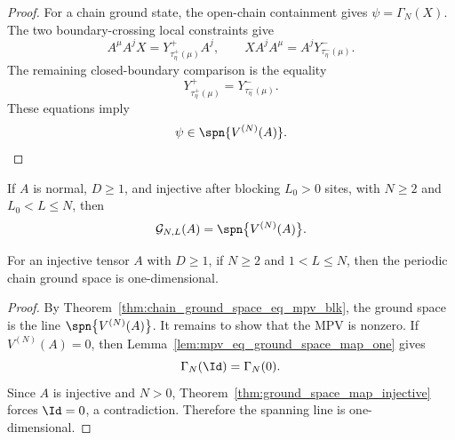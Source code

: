 \begin{proof}
    \notready
    For a chain ground state, the open-chain containment gives
    $\psi=\Gamma_N(X)$. The two boundary-crossing local constraints give
    \[
        A^\mu A^j X = Y^+_{\tau^+_\eta(\mu)}A^j,
        \qquad
        X A^j A^\mu = A^jY^-_{\tau^-_\eta(\mu)}.
    \]
    The remaining closed-boundary comparison is the equality
    \[
        Y^+_{\tau^+_\eta(\mu)} = Y^-_{\tau^-_\eta(\mu)}.
    \]
    These equations imply
    \[
        \psi\in\spn\{V^{(N)}(A)\}.
    \]
\end{proof}

\begin{theorem}%
    \label{thm:chain_ground_space_eq_mpv_normal}
    \leanok
    If $A$ is normal, $D \ge 1$, and injective after blocking $L_0>0$ sites, with
    $N \ge 2$ and $L_0 < L \le N$, then
    \[
        \mathcal G_{N,L}(A) = \spn\bigl\{V^{(N)}(A)\bigr\}.
    \]
\end{theorem}

\begin{theorem}%
    \label{thm:ground_space_unique_periodic}
    \leanok
    For an injective tensor $A$ with $D \ge 1$, if $N \ge 2$ and
    $1 < L \le N$, then the periodic chain ground space is one-dimensional.
\end{theorem}

\begin{proof}
    \leanok
    By Theorem~\ref{thm:chain_ground_space_eq_mpv_blk}, the ground space is the line
    $\spn\bigl\{V^{(N)}(A)\bigr\}$. It remains to show that the MPV is nonzero. If
    $V^{(N)}(A)=0$, then Lemma~\ref{lem:mpv_eq_ground_space_map_one} gives
    \[
        \Gamma_{N}(\Id) = \Gamma_{N}(0).
    \]
    Since $A$ is injective and $N > 0$, Theorem~\ref{thm:ground_space_map_injective}
    forces $\Id = 0$, a contradiction. Therefore the spanning line is one-dimensional.
\end{proof}

